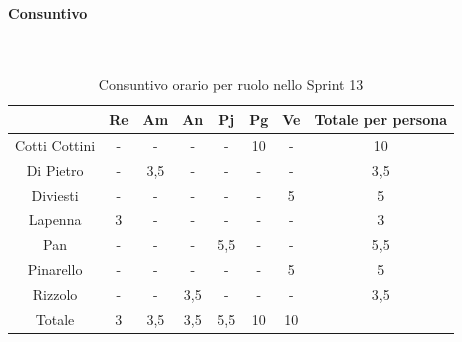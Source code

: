 \documentclass{article}
\begin{document}
                \paragraph{Consuntivo}\mbox{}\\
                \begin{table}[H]
                    \centering
                    \begin{tabular}{|c|c|c|c|c|c|c|c|}
                    \hline
                                  & Re  & Am  & An  & Pj  & Pg  & Ve  & Totale per persona \\ \hline
                    Cotti Cottini & -   & -   & -   & -   & 10  & -   & 10                 \\ \hline
                    Di Pietro     & -   & 3,5 & -   & -   & -   & -   & 3,5                \\ \hline
                    Diviesti      & -   & -   & -   & -   & -   & 5   & 5                  \\ \hline
                    Lapenna       & 3   & -   & -   & -   & -   & -   & 3                  \\ \hline
                    Pan           & -   & -   & -   & 5,5 & -   & -   & 5,5                \\ \hline
                    Pinarello     & -   & -   & -   & -   & -   & 5   & 5                  \\ \hline
                    Rizzolo       & -   & -   & 3,5 & -   & -   & -   & 3,5                \\ \hline
                    Totale        & 3   & 3,5 & 3,5 & 5,5 & 10  & 10  &                    \\ \hline
                    \end{tabular}
                    \caption{Consuntivo orario per ruolo nello Sprint 13}
                \end{table}

\end{document}
